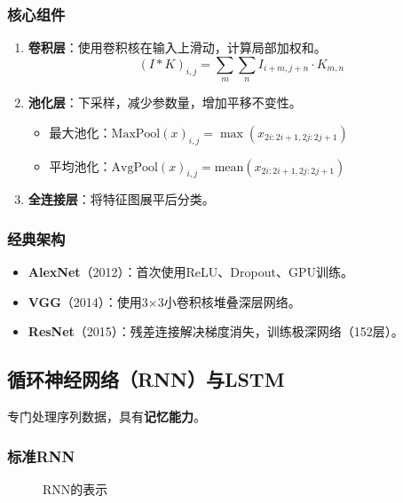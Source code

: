 \subsubsection{核心组件}
\begin{enumerate}
    \item \textbf{卷积层}：使用卷积核在输入上滑动，计算局部加权和。
    \[
    (I * K)_{i,j} = \sum_{m} \sum_{n} I_{i+m, j+n} \cdot K_{m,n}
    \]
    
    \item \textbf{池化层}：下采样，减少参数量，增加平移不变性。
    \begin{itemize}
        \item 最大池化：$ \text{MaxPool}(x)_{i,j} = \max(x_{2i:2i+1, 2j:2j+1}) $
        \item 平均池化：$ \text{AvgPool}(x)_{i,j} = \text{mean}(x_{2i:2i+1, 2j:2j+1}) $
    \end{itemize}
    
    \item \textbf{全连接层}：将特征图展平后分类。
\end{enumerate}

\subsubsection{经典架构}
\begin{itemize}
    \item \textbf{AlexNet}（2012）：首次使用ReLU、Dropout、GPU训练。
    \item \textbf{VGG}（2014）：使用3×3小卷积核堆叠深层网络。
    \item \textbf{ResNet}（2015）：残差连接解决梯度消失，训练极深网络（152层）。
\end{itemize}

\subsection{循环神经网络（RNN）与LSTM}

专门处理序列数据，具有\textbf{记忆能力}。

\subsubsection{标准RNN}
\begin{figure}[h]
\centering
{}
\caption{RNN的表示}
\end{figure}

